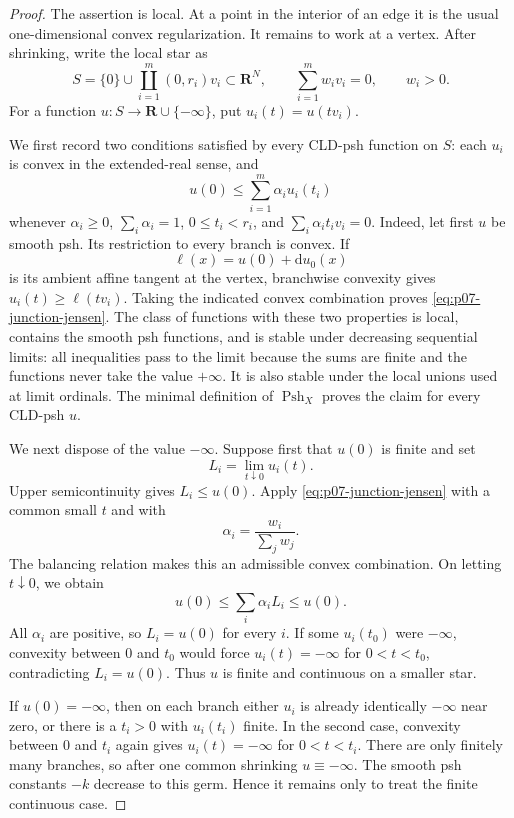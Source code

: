 \begin{proof}
The assertion is local.  At a point in the interior of an edge it is the
usual one-dimensional convex regularization.  It remains to work at a
vertex.  After shrinking, write the local star as
\[
 S=\{0\}\cup\coprod_{i=1}^m(0,r_i)v_i\subset\mathbf R^N,
 \qquad
 \sum_{i=1}^m w_i v_i=0,
 \qquad w_i>0.
\]
For a function $u:S\to\mathbf R\cup\{-\infty\}$, put
$u_i(t)=u(tv_i)$.

We first record two conditions satisfied by every CLD-psh function on $S$:
each $u_i$ is convex in the extended-real sense, and
\begin{equation}
\label{eq:p07-junction-jensen}
 u(0)\leq\sum_{i=1}^m\alpha_i u_i(t_i)
\end{equation}
whenever $\alpha_i\geq0$, $\sum_i\alpha_i=1$,
$0\leq t_i<r_i$, and $\sum_i\alpha_i t_i v_i=0$.
Indeed, let first $u$ be smooth psh.  Its restriction to every branch is
convex.  If
\[
                   \ell(x)=u(0)+\mathrm d u_0(x)
\]
is its ambient affine tangent at the vertex, branchwise convexity gives
$u_i(t)\geq\ell(tv_i)$.  Taking the indicated convex combination proves
\eqref{eq:p07-junction-jensen}.  The class of functions with these two
properties is local, contains the smooth psh functions, and is stable under
decreasing sequential limits: all inequalities pass to the limit because
the sums are finite and the functions never take the value $+\infty$.
It is also stable under the local unions used at limit ordinals.  The
minimal definition of $\operatorname{Psh}_X$ proves the claim for every
CLD-psh $u$.

We next dispose of the value $-\infty$.  Suppose first that $u(0)$ is
finite and set
\[
                  L_i=\lim_{t\downarrow0}u_i(t).
\]
Upper semicontinuity gives $L_i\leq u(0)$.  Apply
\eqref{eq:p07-junction-jensen} with a common small $t$ and with
\[
                 \alpha_i=\frac{w_i}{\sum_jw_j}.
\]
The balancing relation makes this an admissible convex combination.  On
letting $t\downarrow0$, we obtain
\[
 u(0)\leq\sum_i\alpha_iL_i\leq u(0).
\]
All $\alpha_i$ are positive, so $L_i=u(0)$ for every $i$.  If some
$u_i(t_0)$ were $-\infty$, convexity between $0$ and $t_0$ would force
$u_i(t)=-\infty$ for $0<t<t_0$, contradicting $L_i=u(0)$.  Thus $u$ is
finite and continuous on a smaller star.

If $u(0)=-\infty$, then on each branch either $u_i$ is already
identically $-\infty$ near zero, or there is a $t_i>0$ with $u_i(t_i)$
finite.  In the second case, convexity between $0$ and $t_i$ again gives
$u_i(t)=-\infty$ for $0<t<t_i$.  There are only finitely many branches, so
after one common shrinking $u\equiv-\infty$.  The smooth psh constants
$-k$ decrease to this germ.  Hence it remains only to treat the finite
continuous case.


\end{proof}

